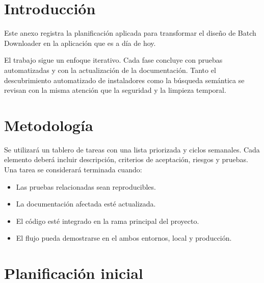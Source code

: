 
\section{Introducción}

Este anexo registra la planificación aplicada para transformar el diseño de Batch Downloader en la aplicación que es a día de hoy.

El trabajo sigue un enfoque iterativo. Cada fase concluye con pruebas automatizadas y con la actualización de la documentación. Tanto el descubrimiento automatizado de instaladores como la búsqueda semántica se revisan con la misma atención que la seguridad y la limpieza temporal.

\section{Metodología}

Se utilizará un tablero de tareas con una lista priorizada y ciclos semanales. Cada elemento deberá incluir descripción, criterios de aceptación, riesgos y pruebas. Una tarea se considerará terminada cuando:

\begin{itemize}
	\item Las pruebas relacionadas sean reproducibles.
	\item La documentación afectada esté actualizada.
	\item El código esté integrado en la rama principal del proyecto.
	\item El flujo pueda demostrarse en el ambos entornos, local y producción.
\end{itemize}

\section{Planificación inicial}

